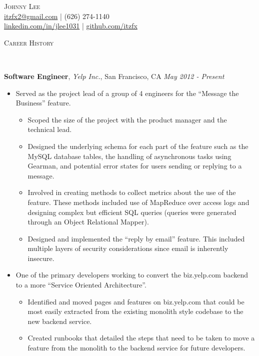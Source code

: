 \documentclass{article}
\newenvironment{changemargin}[2]{%
  \begin{list}{}{%
    \setlength{\topsep}{0pt}%
    \setlength{\leftmargin}{#1}%
    \setlength{\rightmargin}{#2}%
    \setlength{\listparindent}{\parindent}%
    \setlength{\itemindent}{\parindent}%
    \setlength{\parsep}{\parskip}%
  }%
  \item[]}{\end{list}
}
\newcommand{\lineover}{
  \begin{changemargin}{-0.05in}{-0.05in}
    \vspace*{-8pt}
    \hrulefill \\
    \vspace*{-2pt}
  \end{changemargin}
}
\newcommand{\header}[1]{
  \begin{changemargin}{-0.5in}{-0.5in}
    \scshape{#1}\\
  \lineover
  \end{changemargin}
}
\newcommand{\contact}[5]{
  \begin{changemargin}{-0.5in}{-0.5in}
    \begin{center}
      {\Large \scshape {#1}}\\ \smallskip
      {#2} | {#3}\\ \smallskip
      {#4} | {#5}\\ \smallskip
    \end{center}
  \end{changemargin}
}
\newenvironment{body} {
  \vspace*{-16pt}
  \begin{changemargin}{-0.25in}{-0.5in}
  }
  {\end{changemargin}
}
\begin{document}
\contact{Johnny Lee}
        {\href{mailto:itzfx2@gmail.com}{itzfx2@gmail.com}}
        {(626) 274-1140}
        {\href{https://www.linkedin.com/in/jlee1031}{linkedin.com/in/jlee1031}}
        {\href{https://github.com/itzfx}{github.com/itzfx}}


\header{Career History}

\begin{body}
  \vspace{14pt}
  \textbf{Software Engineer}, \emph{Yelp Inc.}, San Francisco, CA \hfill \emph{May 2012 - Present}\\
  \vspace*{-4pt}
  \begin{itemize} \itemsep -0pt  %

    \item Served as the project lead of a group of 4 engineers for the ``Message the Business'' feature.
    \begin{itemize} \itemsep -0pt
      \item Scoped the size of the project with the product manager and the technical lead.
      \item Designed the underlying schema for each part of the feature such as the MySQL database tables, the handling of asynchronous tasks using Gearman, and potential error states for users sending or replying to a message.
      \item Involved in creating methods to collect metrics about the use of the feature. These methods included use of MapReduce over access logs and designing complex but efficient SQL queries (queries were generated through an Object Relational Mapper).
      \item Designed and implemented the ``reply by email'' feature. This included multiple layers of security considerations since email is inherently insecure.
    \end{itemize}

    \item One of the primary developers working to convert the biz.yelp.com backend to a more ``Service Oriented Architecture''.
    \begin{itemize} \itemsep -0pt
      \item Identified and moved pages and features on biz.yelp.com that could be most easily extracted from the existing monolith style codebase to the new backend service.
      \item Created runbooks that detailed the steps that need to be taken to move a feature from the monolith to the backend service for future developers.
    \end{itemize}


\end{itemize}
\end{body}
\end{document}
